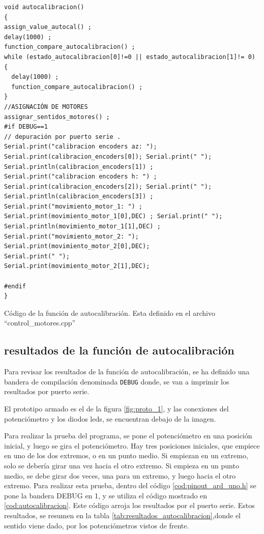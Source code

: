 \begin{listing}[ht]
	\begin{verbatim}
void autocalibracion()
{
assign_value_autocal() ;
delay(1000) ; 
function_compare_autocalibracion() ; 
while (estado_autocalibracion[0]!=0 || estado_autocalibracion[1]!= 0)
{
  delay(1000) ;     
  function_compare_autocalibracion() ;             
}
//ASIGNACIÓN DE MOTORES 
assignar_sentidos_motores() ; 
#if DEBUG==1
// depuración por puerto serie . 
Serial.print("calibracion encoders az: ");                   
Serial.print(calibracion_encoders[0]); Serial.print(" ");
Serial.println(calibracion_encoders[1]) ;
Serial.print("calibracion encoders h: ") ;
Serial.print(calibracion_encoders[2]); Serial.print(" ");
Serial.println(calibracion_encoders[3]) ;
Serial.print("movimiento_motor_1: ") ; 
Serial.print(movimiento_motor_1[0],DEC) ; Serial.print(" "); 
Serial.println(movimiento_motor_1[1],DEC) ;
Serial.print("movimiento_motor_2: ");
Serial.print(movimiento_motor_2[0],DEC); 
Serial.print(" ");
Serial.print(movimiento_motor_2[1],DEC); 			

#endif    	
}
\end{verbatim}
\caption{Código de la función de autocalibración. Esta definido en el archivo ``control\_motores.cpp''}
\label{cod:autocalibracion}

\end{listing}

\subsection{resultados de la función de autocalibración}

Para revisar los resultados de la función de autocalibración, se ha definido una bandera de compilación denominada \texttt{DEBUG} donde, se van a imprimir los resultados por puerto serie. 

El prototipo armado es el de la figura \ref{fig:proto_1}, y las conexiones del potenciómetro y los diodos leds, se encuentran debajo de la imagen.  
%

Para realizar la prueba del programa, se pone el potenciómetro en una posición inicial, y luego se gira el potenciómetro. Hay tres posiciones iniciales, que empiece en uno de los dos extremos, o en un punto medio. Si empiezan en un extremo, solo se debería girar una vez hacia el otro extremo. Si empieza en un punto medio, se debe girar dos veces, una para un extremo, y luego hacia el otro extremo. Para realizar esta prueba, dentro del código \ref{cod:pinout_ard_uno.h} se pone la bandera DEBUG en 1, y se utiliza el código mostrado en \ref{cod:autocalibracion}. Este código arroja los resultados por el puerto serie. Estos resultados, se resumen en la tabla \ref{tab:resultados_autocalibracion},donde el sentido viene dado, por los potenciómetros vistos de frente.   


